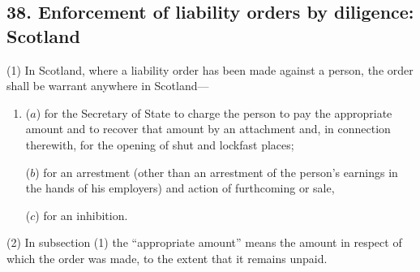 \documentclass[12pt,a4paper]{article}
\begin{document}

\subsection{38. Enforcement of liability orders by diligence: Scotland}

(1) In Scotland, where a liability order has been made against a person, the order shall be warrant anywhere in Scotland—
\begin{enumerate}\item[]
($a$) for the 
Secretary of State  %
to charge the person to pay the appropriate amount and to recover that amount by 
an attachment  %
and, in connection therewith, for the opening of shut and lockfast places;

%

($b$) for an arrestment (other than an arrestment of the person’s earnings in the hands of his employers) and action of furthcoming or sale,

($c$) for an inhibition.
\end{enumerate}

(2) In subsection (1)  the “appropriate amount” means the amount in respect of which the order was made, to the extent that it remains unpaid.
\end{document}
